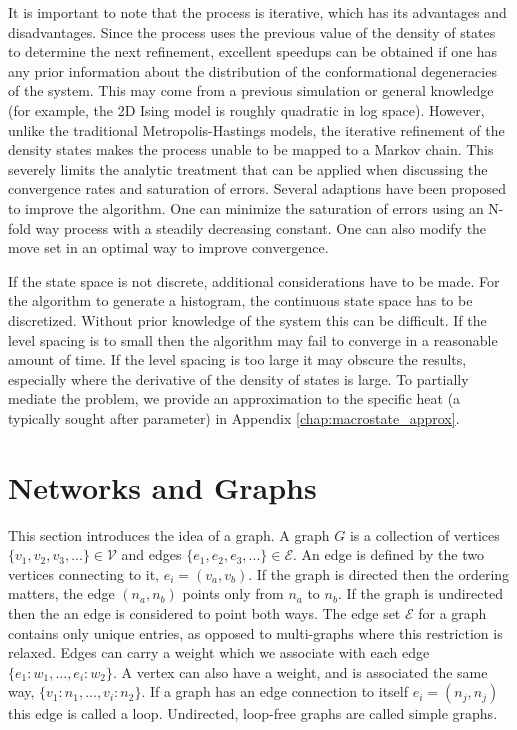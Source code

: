 It is important to note that the process is iterative, which has its advantages and disadvantages. Since the process uses the previous value of the density of states to determine the next refinement, excellent speedups can be obtained if one has any prior information about the distribution of the conformational degeneracies of the system. This may come from a previous simulation or general knowledge (for example, the 2D Ising model is roughly quadratic in log space). However, unlike the traditional Metropolis-Hastings models, the iterative refinement of the density states makes the process unable to be mapped to a Markov chain. This severely limits the analytic treatment that can be applied when discussing the convergence rates and saturation of errors. Several adaptions have been proposed to improve the algorithm. One can minimize the saturation of errors using an N-fold way process\cite{belardinelli_wang-landau_2007} with a steadily decreasing constant. One can also modify the move set in an optimal way to improve convergence.\cite{wu_overcoming_2005}

If the state space is not discrete, additional considerations have to be made. For the algorithm to generate a histogram, the continuous state space has to be discretized. Without prior knowledge of the system this can be difficult. If the level spacing is to small then the algorithm may fail to converge in a reasonable amount of time. If the level spacing is too large it may obscure the results, especially where the derivative of the density of states is large. To partially mediate the problem, we provide an approximation to the specific heat (a typically sought after parameter) in Appendix \ref{chap:macrostate_approx}.


\section{Networks and Graphs}
\label{sec:graph_introduction}

This section introduces the idea of a graph. A graph $G$ is a collection of vertices $\{v_1, v_2, v_3, ...\} \in \mathcal{V}$ and edges $\{e_1, e_2, e_3, ...\} \in \mathcal{E}$. An edge is defined by the two vertices connecting to it, $e_i = (v_a, v_b)$. If the graph is directed then the ordering matters, \ie  the edge $(n_a, n_b)$ points only from $n_a$ to $n_b$. If the graph is undirected then the an edge is considered to point both ways. The edge set $\mathcal{E}$ for a graph contains only unique entries, as opposed to multi-graphs where this restriction is relaxed. Edges can carry a weight which we associate with each edge $\{e_1 : w_1, ..., e_i : w_2\}$. A vertex can also have a weight, and is associated the same way, $\{v_1 : n_1, ..., v_i : n_2\}$. If a graph has an edge connection to itself $e_i = (n_j, n_j)$ this edge is called a loop. Undirected, loop-free graphs are called simple graphs.

